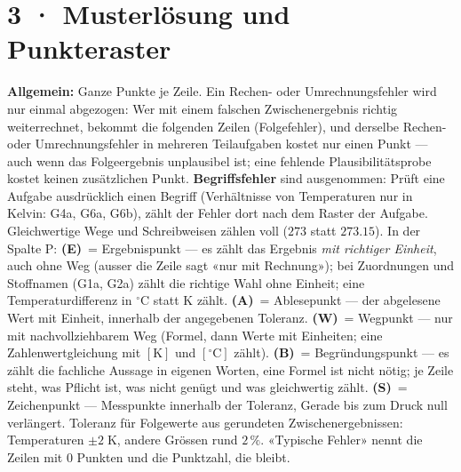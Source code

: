 \documentclass[11pt]{article}
\begin{document}
\section*{3 · Musterlösung und Punkteraster}
\textbf{Allgemein:} Ganze Punkte je Zeile. Ein Rechen- oder Umrechnungsfehler wird nur einmal abgezogen: Wer mit einem falschen Zwischenergebnis
richtig weiterrechnet, bekommt die folgenden Zeilen (Folgefehler), und derselbe Rechen- oder Umrechnungsfehler in mehreren Teilaufgaben kostet nur einen Punkt — auch wenn das Folgeergebnis unplausibel ist; eine fehlende
Plausibilitätsprobe kostet keinen zusätzlichen Punkt. \textbf{Begriffsfehler} sind ausgenommen: Prüft eine Aufgabe ausdrücklich einen Begriff (Verhältnisse von Temperaturen nur in Kelvin: G4a, G6a, G6b), zählt der Fehler dort nach dem Raster der Aufgabe.
Gleichwertige Wege und Schreibweisen zählen voll ($273$ statt $273.15$).
In der Spalte P: \textbf{(E)}~= Ergebnispunkt — es zählt das Ergebnis \emph{mit richtiger Einheit}, auch ohne Weg (ausser die Zeile sagt «nur mit Rechnung»); bei Zuordnungen und Stoffnamen (G1a, G2a) zählt die richtige Wahl ohne Einheit; eine Temperaturdifferenz in $^\circ\text{C}$ statt $\text{K}$ zählt. \textbf{(A)}~= Ablesepunkt — der abgelesene Wert mit Einheit, innerhalb der angegebenen Toleranz. \textbf{(W)}~= Wegpunkt — nur mit nachvollziehbarem Weg (Formel, dann Werte mit Einheiten; eine Zahlenwertgleichung mit $[\text{K}]$ und $[^\circ\text{C}]$ zählt).
\textbf{(B)}~= Begründungspunkt — es zählt die fachliche Aussage in eigenen Worten, eine Formel ist nicht nötig; je Zeile steht, was Pflicht ist, was nicht genügt und was gleichwertig zählt. \textbf{(S)}~= Zeichenpunkt — Messpunkte innerhalb der Toleranz, Gerade bis zum Druck null verlängert.
Toleranz für Folgewerte aus gerundeten Zwischenergebnissen: Temperaturen $\pm 2\;\text{K}$, andere Grössen rund $2\,\%$.
«Typische Fehler» nennt die Zeilen mit 0 Punkten und die Punktzahl, die bleibt.
\end{document}
